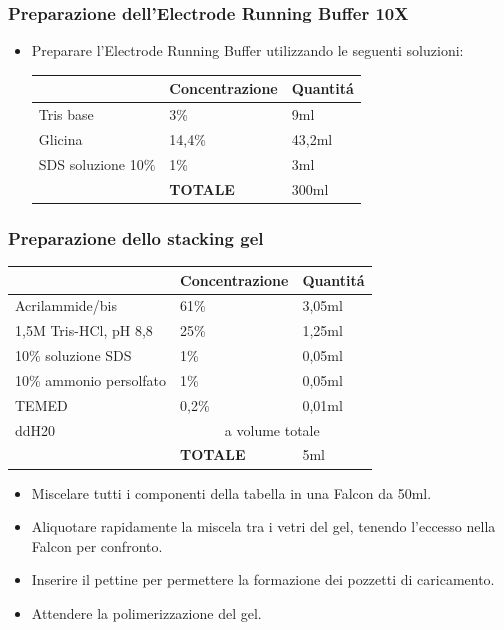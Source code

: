 \subsubsection{Preparazione dell'Electrode Running Buffer 10X}
\begin{itemize}
	\item Preparare l'Electrode Running Buffer utilizzando
	le seguenti soluzioni:\\
	\begin{tabular}{|l|l|l|} \hline
		& \textbf{Concentrazione} & \textbf{Quantit\'a} \\\hline
		Tris base & 3\% & 9ml \\\hline
		Glicina & 14,4\% & 43,2ml \\\hline
		SDS soluzione 10\% & 1\% & 3ml \\\hline
		& \textbf{TOTALE} & 300ml \\\hline
	\end{tabular}
\end{itemize}

\subsubsection{Preparazione dello stacking gel}

\begin{tabular}{|l|l|l|} \hline
	& \textbf{Concentrazione} & \textbf{Quantit\'a} \\\hline
	Acrilammide/bis & 61\% & 3,05ml \\\hline
	1,5M Tris-HCl, pH 8,8 & 25\% & 1,25ml \\\hline
	10\% soluzione SDS & 1\% & 0,05ml \\\hline
	10\% ammonio persolfato & 1\% & 0,05ml \\\hline
	TEMED & 0,2\% & 0,01ml \\\hline
	ddH20 & \multicolumn{2}{c|}{a volume totale} \\\hline
	& \textbf{TOTALE} & 5ml \\\hline
\end{tabular}

\begin{itemize}
	\item Miscelare tutti i componenti della tabella in una Falcon
	da 50ml.
	\item Aliquotare rapidamente la miscela tra i vetri del gel, tenendo
	l'eccesso nella Falcon per confronto.
	\item Inserire il pettine per permettere la formazione dei pozzetti
	di caricamento.
	\item Attendere la polimerizzazione del gel.
\end{itemize}

